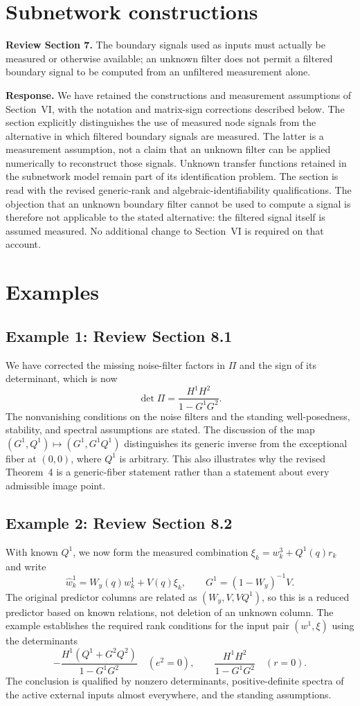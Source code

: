 \documentclass[11pt]{article}
\begin{document}
\section{Subnetwork constructions}
\textbf{Review Section 7.}
The boundary signals used as inputs must actually be measured or otherwise
available; an unknown filter does not permit a filtered boundary signal to be
computed from an unfiltered measurement alone.

\textbf{Response.}
We have retained the constructions and measurement assumptions of Section~VI,
with the notation and matrix-sign corrections described below. The section
explicitly distinguishes the use of
measured node signals from the alternative in which filtered boundary signals
are measured. The latter is a measurement assumption, not a claim that an
unknown filter can be applied numerically to reconstruct those signals.
Unknown transfer functions retained in the subnetwork model remain part of
its identification problem. The section is read with the revised generic-rank
and algebraic-identifiability qualifications. The objection that an unknown
boundary filter cannot be used to compute a signal is therefore not applicable
to the stated alternative: the filtered signal itself is assumed measured.
No additional change to Section~VI is required on that account.

\section{Examples}
\subsection*{Example 1: Review Section 8.1}
We have corrected the missing noise-filter factors in $\Pi$ and the sign of its
determinant, which is now
\[
\det\Pi=\frac{H^1H^2}{1-G^1G^2}.
\]
The nonvanishing conditions on the noise filters and the standing well-posedness,
stability, and spectral assumptions are stated. The discussion of the map
$(G^1,Q^1)\mapsto(G^1,G^1Q^1)$ distinguishes its generic inverse from the
exceptional fiber at $(0,0)$, where $Q^1$ is arbitrary. This also illustrates why
the revised Theorem~4 is a generic-fiber statement rather than a statement about
every admissible image point.

\subsection*{Example 2: Review Section 8.2}
With known $Q^1$, we now form the measured combination
$\xi_k=w_k^3+Q^1(q)r_k$ and write
\[
\hat w_k^1=W_y(q)w_k^1+V(q)\xi_k,
\qquad G^1=(1-W_y)^{-1}V.
\]
The original predictor columns are related as $(W_y,V,VQ^1)$, so this is a
reduced predictor based on known relations, not deletion of an unknown column.
The example establishes the required rank conditions for the input pair
$(w^1,\xi)$ using the determinants
\[
-\frac{H^1(Q^1+G^2Q^2)}{1-G^1G^2}\quad(e^2=0),
\qquad
\frac{H^1H^2}{1-G^1G^2}\quad(r=0).
\]
The conclusion is qualified by nonzero determinants, positive-definite spectra
of the active external inputs almost everywhere, and the standing assumptions.
\end{document}
